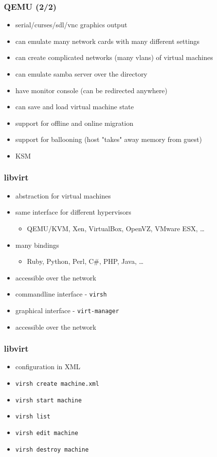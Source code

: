 \documentclass{beamer}
\begin{document}
\begin{frame}[t]
\frametitle{QEMU (2/2)}
\begin{itemize}
   \item serial/curses/sdl/vnc graphics output
   \item can emulate many network cards with many different settings
   \item can create complicated networks (many vlans) of virtual machines
   \item can emulate samba server over the directory
   \item have monitor console (can be redirected anywhere)
   \item can save and load virtual machine state
   \item support for offline and online migration
   \item support for ballooning (host "takes" away memory from guest)
   \item KSM
\end{itemize}
\end{frame}



\begin{frame}[t]
\frametitle{libvirt}
\begin{itemize}
   \item abstraction for virtual machines
   \item same interface for different hypervisors
   \begin{itemize}
   	\item QEMU/KVM, Xen, VirtualBox, OpenVZ, VMware ESX, \dots
   \end{itemize}
   \item many bindings
   \begin{itemize}
   	\item Ruby, Python, Perl, C\#, PHP, Java, \dots
   \end{itemize}
   \item accessible over the network
   \item commandline interface - \texttt{virsh}
   \item graphical interface - \texttt{virt-manager}
   \item accessible over the network
\end{itemize}
\end{frame}

\begin{frame}[t]
\frametitle{libvirt}
\begin{itemize}
   \item configuration in XML
   \item \texttt{virsh create machine.xml}
   \item \texttt{virsh start machine}
   \item \texttt{virsh list}
   \item \texttt{virsh edit machine}
   \item \texttt{virsh destroy machine}
\end{itemize}
\end{frame}
\end{document}
